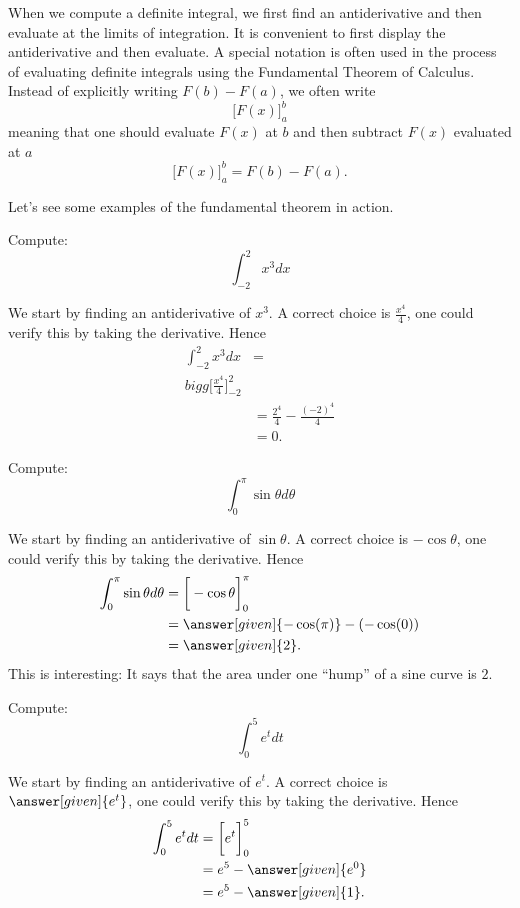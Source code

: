 \documentclass{ximera}
\begin{document}
When we compute a definite integral, we first find an antiderivative
and then evaluate at the limits of integration. It is convenient to
first display the antiderivative and then evaluate.  A special
notation is often used in the process of evaluating definite integrals
using the Fundamental Theorem of Calculus. Instead of explicitly
writing $F(b)-F(a)$, we often write
\[
\bigg[ F(x) \bigg]_a^b
\]
meaning that one should evaluate $F(x)$ at $b$ and then subtract
$F(x)$ evaluated at $a$
\[
\bigg[ F(x) \bigg]_a^b = F(b)-F(a).
\]

Let's see some examples of the fundamental theorem in action.

\begin{example}
  Compute:
  \[
  \int_{-2}^2 x^3 dx
  \]
  \begin{explanation}
    We start by finding an antiderivative of $x^3$.  A correct choice
    is $\frac{x^{4}}{4}$, one could verify this by taking the
    derivative. Hence
    \begin{align*}
      \int_{-2}^2 x^3 dx &=\\bigg[ \frac{x^4}{4} \bigg]_{-2}^2\\
      &= \frac{2^4}{4} - \frac{(-2)^4}{4}\\
      &= 0.
    \end{align*}
  \end{explanation}
\end{example}


\begin{example}
  Compute:
  \[
  \int_0^\pi \sin \theta d\theta
  \]
  \begin{explanation}
    We start by finding an antiderivative of $\sin \theta$.  A correct
    choice is $-\cos\theta$, one could verify this by taking the
    derivative. Hence
    \begin{align*}
      \int_0^\pi \sin\theta d\theta &= \bigg[ -\cos\theta \bigg]_0^\pi\\
      &=\answer[given]{-\cos(\pi)} - (-\cos(0))\\
      &=\answer[given]{2}.
    \end{align*}
    This is interesting: It says that the area under one ``hump'' of a
    sine curve is $2$.
  \end{explanation}
\end{example}

\begin{example}
  Compute:
  \[
  \int_0^5 e^t dt
  \]
  \begin{explanation}
    We start by finding an antiderivative of $e^t$.  A correct choice
    is $\answer[given]{e^t}$, one could verify this by taking the
    derivative. Hence
    \begin{align*}
      \int_0^5 e^t dt &= \bigg[ e^t \bigg]_0^5 \\
      &= e^5-\answer[given]{e^0}\\
      &= e^5-\answer[given]{1}.
    \end{align*}
  \end{explanation}
\end{example}
\end{document}
